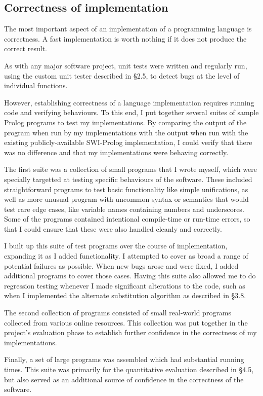 \documentclass[12pt]{article}
\begin{document}
\subsection{Correctness of implementation}

The most important aspect of an implementation of a programming language is correctness. 
A fast implementation is worth nothing if it does not produce the correct result.

As with any major software project, unit tests were written and regularly run, using the custom unit tester described in \S2.5, to detect bugs at the level of individual functions.

However, establishing correctness of a language implementation requires running code and verifying behaviours.
To this end, I put together several suites of sample Prolog programs to test my implementations.
By comparing the output of the program when run by my implementations with the output when run with the existing publicly-available SWI-Prolog implementation, I could verify that there was no difference and that my implementations were behaving correctly.

The first suite was a collection of small programs that I wrote myself, which were specially targetted at testing specific behaviours of the software.
These included straightforward programs to test basic functionality like simple unifications, as well as more unusual program with uncommon syntax or semantics that would test rare edge cases, like variable names containing numbers and underscores.
Some of the programs contained intentional compile-time or run-time errors, so that I could ensure that these were also handled cleanly and correctly.

I built up this suite of test programs over the course of implementation, expanding it as I added functionality. 
I attempted to cover as broad a range of potential failures as possible. 
When new bugs arose and were fixed, I added additional programs to cover those cases.
Having this suite also allowed me to do regression testing whenever I made significant alterations to the code, such as when I implemented the alternate substitution algorithm as described in \S3.8.

The second collection of programs consisted of small real-world programs collected from various online resources.
This collection was put together in the project's evaluation phase to establish further confidence in the correctness of my implementations.

Finally, a set of large programs was assembled which had substantial running times. 
This suite was primarily for the quantitative evaluation described in \S4.5, but also served as an additional source of confidence in the correctness of the software.
\end{document}

